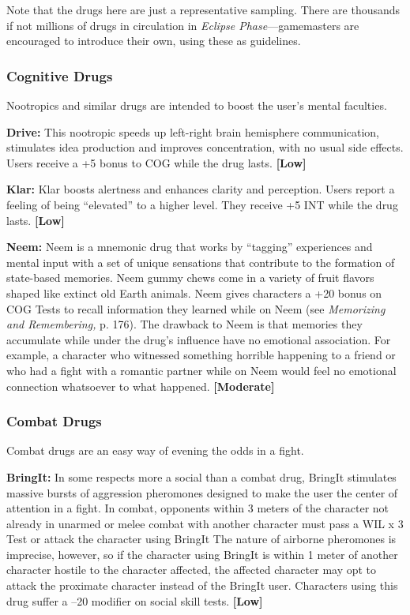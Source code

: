 Note that the drugs here are just a representative 
sampling. There are thousands if not millions of 
drugs in circulation in \textit{Eclipse Phase}—gamemasters 
are encouraged to introduce their own, using these 
as guidelines.

\subsubsection{Cognitive Drugs}

Nootropics and similar drugs are intended to boost 
the user's mental faculties.

\textbf{Drive:} This nootropic speeds up left-right brain 
hemisphere communication, stimulates idea production
and improves concentration, with no usual side
effects. Users receive a +5 bonus to COG while the 
drug lasts. \textbf{[Low]}

\textbf{Klar:} Klar boosts alertness and enhances clarity and 
perception. Users report a feeling of being ``elevated'' 
to a higher level. They receive +5 INT while the drug 
lasts. \textbf{[Low]}

\textbf{Neem:} Neem is a mnemonic drug that works by 
``tagging'' experiences and mental input with a set of 
unique sensations that contribute to the formation 
of state-based memories. Neem gummy chews come 
in a variety of fruit flavors shaped like extinct old 
Earth animals. Neem gives characters a +20 bonus 
on COG Tests to recall information they learned 
while on Neem (see \textit{Memorizing and Remembering,}
p. 176). The drawback to Neem is that memories they 
accumulate while under the drug's influence have no 
emotional association. For example, a character who 
witnessed something horrible happening to a friend 
or who had a fight with a romantic partner while on 
Neem would feel no emotional connection whatsoever 
to what happened. \textbf{[Moderate]}

\subsubsection{Combat Drugs}

Combat drugs are an easy way of evening the odds 
in a fight.

\textbf{BringIt:} In some respects more a social than a 
combat drug, BringIt stimulates massive bursts of aggression
pheromones designed to make the user the
center of attention in a fight. In combat, opponents 
within 3 meters of the character not already in unarmed
or melee combat with another character must
pass a WIL x 3 Test or attack the character using BringIt
The nature of airborne pheromones is imprecise,
however, so if the character using BringIt is within 
1 meter of another character hostile to the character 
affected, the affected character may opt to attack the 
proximate character instead of the BringIt user. Characters
using this drug suffer a –20 modifier on social
skill tests. \textbf{[Low]}

